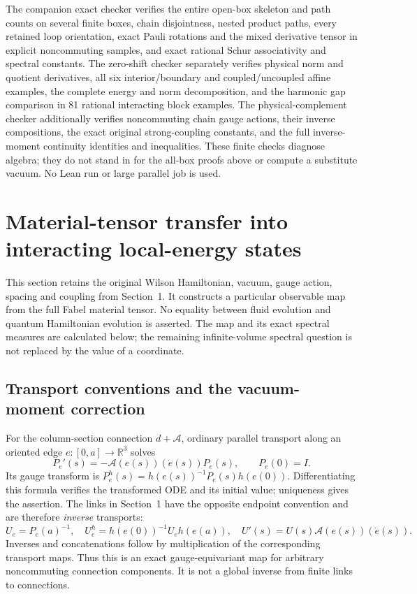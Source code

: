 \documentclass[11pt]{article}
\begin{document}
The companion exact checker verifies the entire open-box skeleton and
path counts on several finite boxes, chain disjointness, nested product
paths, every retained loop orientation, exact Pauli rotations and the
mixed derivative tensor in explicit noncommuting samples, and exact
rational Schur associativity and spectral constants.
The zero-shift checker separately verifies physical norm and quotient
derivatives, all six interior/boundary and coupled/uncoupled affine
examples, the complete energy and norm decomposition, and the harmonic
gap comparison in 81 rational interacting block examples.
The physical-complement checker additionally verifies noncommuting
chain gauge actions, their inverse compositions, the exact original
strong-coupling constants, and the full inverse-moment continuity
identities and inequalities. These finite checks
diagnose algebra; they do not stand in for the all-box proofs above or
compute a substitute vacuum. No Lean run or large parallel job is used.

\section{Material-tensor transfer into interacting local-energy states}
\label{sec:fabel-tensor}
This section retains the original Wilson Hamiltonian, vacuum, gauge action,
spacing and coupling from Section~1. It constructs a particular observable
map from the full Fabel material tensor. No equality between fluid evolution
and quantum Hamiltonian evolution is asserted. The map and its exact
spectral measures are calculated below; the remaining infinite-volume
spectral question is not replaced by the value of a coordinate.

\subsection{Transport conventions and the vacuum-moment correction}
For the column-section connection $d+\mathcal A$, ordinary parallel transport
along an oriented edge $e:[0,a]\to\mathbb R^3$ solves
\[
 P_e'(s)=-\mathcal A(e(s))(\dot e(s))P_e(s),\qquad P_e(0)=I.
\]
Its gauge transform is $P_e^h(s)=h(e(s))^{-1}P_e(s)h(e(0))$.
Differentiating this formula verifies the transformed ODE and its initial
value; uniqueness gives the assertion. The links in Section~1 have the
opposite endpoint convention and are therefore \emph{inverse} transports:
\begin{equation}\label{eq:fabel-inverse-transport}
 U_e=P_e(a)^{-1},\quad
 U_e^h=h(e(0))^{-1}U_eh(e(a)),\quad U'(s)=U(s)\mathcal A(e(s))(\dot e(s)).
\end{equation}
Inverses and concatenations follow by multiplication of the corresponding
transport maps. Thus this is an exact gauge-equivariant map for arbitrary
noncommuting connection components. It is not a global inverse from finite
links to connections.
\end{document}

